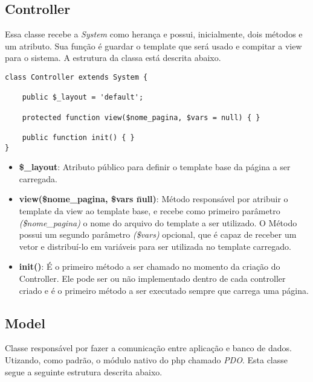         \subsection{Controller\label{sub:system-controller}}
            Essa classe recebe a \emph{System} como herança e possui, inicialmente, dois métodos e um atributo. Sua função é guardar o template que será usado e compitar a view para o sistema. A estrutura da classa está descrita abaixo.


\begin{lstlisting}
class Controller extends System {

    public $_layout = 'default';

    protected function view($nome_pagina, $vars = null) { }

    public function init() { }
}
\end{lstlisting}

            \begin{itemize}
                \item\textbf{\$\_layout}: Atributo público para definir o template base da página a ser carregada.
                \item\textbf{view(\$nome\_pagina, \$vars \= null)}: Método responsável por atribuir o template da view ao template base, e recebe como primeiro parâmetro \emph{(\$nome\_pagina)} o nome do arquivo do template a ser utilizado. O Método possui um segundo parâmetro \emph{(\$vars)} opcional, que é capaz de receber um vetor e distribuí-lo em variáveis para ser utilizada no template carregado.

                \item\textbf{init()}: É o primeiro método a ser chamado no momento da criação do Controller. Ele pode ser ou não implementado dentro de cada controller criado e é o primeiro método a ser executado sempre que carrega uma página.
            \end{itemize}



        \subsection{Model\label{sub:system-model}}
            Classe responsável por fazer a comunicação entre aplicação e banco de dados. Utizando, como padrão, o módulo nativo do php chamado \emph{PDO}. Esta classe segue a seguinte estrutura descrita abaixo.


